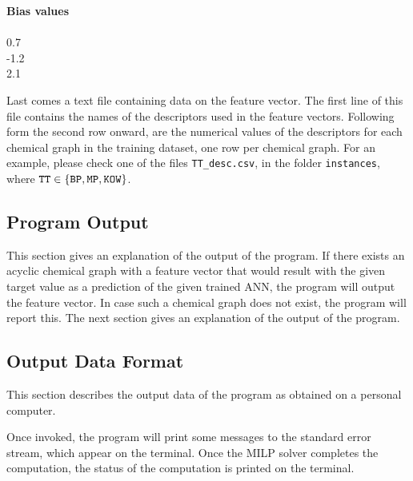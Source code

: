 \documentclass[11pt,titlepage,dvipdfmx,twoside]{book}
\begin{document}
\bigskip

\begin{oframed}
{\bf Bias values}\\\\
0.7\\
-1.2\\
2.1\\
\end{oframed}

\bigskip

Last comes a text file containing data on the feature vector.
The first line of this file contains the names of the descriptors used in the feature vectors.
Following form the second row onward, are the numerical values of the descriptors for each chemical graph
in the training dataset, one row per chemical graph.
For an example, please check one of the files  {\tt TT\_desc.csv},  in the folder {\tt instances},
where ${\tt TT} \in \{{\tt BP, MP, KOW}\}$.



\subsection{Program Output}
\label{chap:section3_3}

This section gives an explanation of the output of the program.
If there exists an acyclic chemical graph with a feature vector that
would result with the given target value as a prediction of
the given trained ANN, the program will output the feature vector.
In case such a chemical graph does not exist, the program will report this.
The next section gives an explanation of the output of the program.


\subsection{Output Data Format}
\label{chap:section3_4}

This section describes the output data of the program as
obtained on a personal computer.

Once invoked, the program will print some messages to the standard error
stream, which appear on the terminal.
Once the MILP solver completes the computation,
the status of the computation is printed on the terminal.

\bigskip
\end{document}
